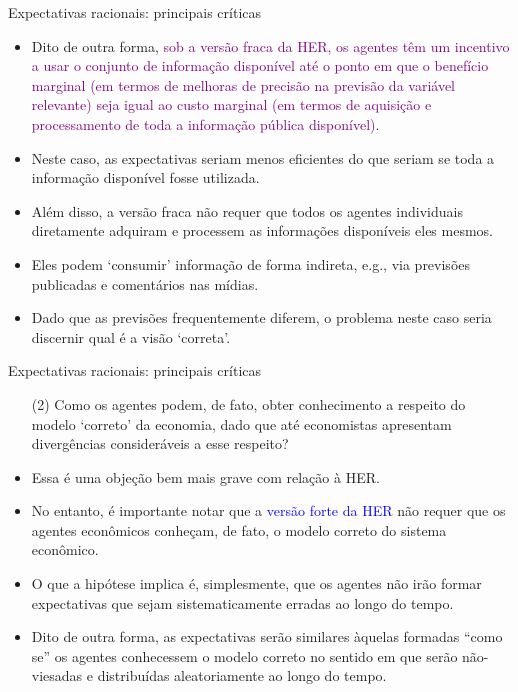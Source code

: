 \documentclass[10pt]{beamer}
\begin{document}
\begin{frame}{Expectativas racionais: principais críticas}
    \begin{itemize}
        \item Dito de outra forma, \textcolor{purple}{sob a versão fraca da HER, os agentes têm um incentivo a usar o conjunto de informação disponível até o ponto em que o benefício marginal (em termos de melhoras de precisão na previsão da variável relevante) seja igual ao custo marginal (em termos de aquisição e processamento de toda a informação pública disponível)}.
        \bigskip
        \item Neste caso, as expectativas seriam menos eficientes do que seriam se toda a informação disponível fosse utilizada.
        \bigskip
        \item Além disso, a versão fraca não requer que todos os agentes individuais diretamente adquiram e processem as informações disponíveis eles mesmos.
        \bigskip
        \item Eles podem `consumir' informação de forma indireta, e.g., via previsões publicadas e comentários nas mídias.
        \bigskip
        \item Dado que as previsões frequentemente diferem, o problema neste caso seria discernir qual é a visão `correta'.
    \end{itemize}
\end{frame}

\begin{frame}{Expectativas racionais: principais críticas}
    \begin{itemize}
        \item[(2)] Como os agentes podem, de fato, obter conhecimento a respeito do modelo `correto' da economia, dado que até economistas apresentam divergências consideráveis a esse respeito?
        \bigskip
        \item Essa é uma objeção bem mais grave com relação à HER.
        \bigskip
        \item No entanto, é importante notar que a \textcolor{blue}{versão forte da HER} não requer que os agentes econômicos conheçam, de fato, o modelo correto do sistema econômico.
        \bigskip
        \item O que a hipótese implica é, simplesmente, que os agentes não irão formar expectativas que sejam sistematicamente erradas ao longo do tempo.
        \bigskip
        \item Dito de outra forma, as expectativas serão similares àquelas formadas ``como se'' os agentes conhecessem o modelo correto no sentido em que serão não-viesadas e distribuídas aleatoriamente ao longo do tempo.
    \end{itemize}
\end{frame}
\end{document}
